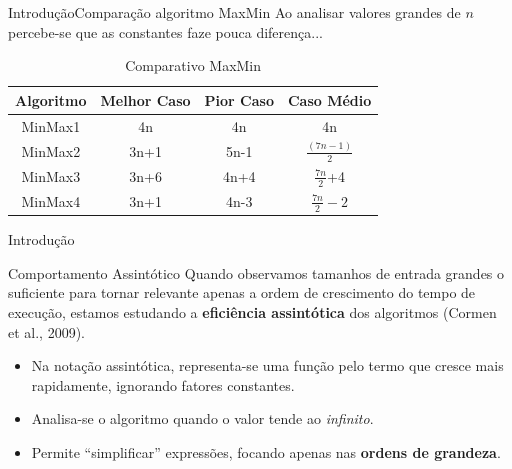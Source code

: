 \documentclass[aspectratio=169]{beamer}
\begin{document}
\begin{frame}{Introdução}{Comparação algoritmo MaxMin}
Ao analisar valores grandes de $n$ percebe-se que as constantes faze pouca diferença...
\begin{table}[]
\centering
\caption{Comparativo MaxMin}
\label{Comparativo2 MaxMin}
\begin{tabular}{c|ccc}
Algoritmo  &  Melhor Caso  &  Pior Caso  &  Caso Médio  \\
\hline
MinMax1  &   4n       &       4n   &  4n \\
MinMax2  &   3n+1     &       5n-1   &  $\frac{(7n -1)}{2}$ \\
MinMax3  &   3n+6     & 4n+4    &  $\frac{7n}{2}$+4 \\
MinMax4  &   3n+1     &      4n-3 &  $\frac{7n}{2}-2$ \\
\end{tabular}
\end{table}
\end{frame}


\begin{frame}{Introdução}
\begin{block}{Comportamento Assintótico}
Quando observamos tamanhos de entrada grandes o suficiente para tornar relevante apenas a ordem de crescimento do tempo de execução, estamos estudando a {\bf eficiência assintótica} dos algoritmos (Cormen et al., 2009).
\end{block}
\begin{itemize}
\item Na notação assintótica, representa-se uma função pelo termo que cresce mais rapidamente, ignorando fatores constantes. 
\item Analisa-se o algoritmo quando o valor tende ao {\it infinito}.
\item Permite ``simplificar'' expressões, focando apenas nas {\bf ordens de grandeza}.
\end{itemize}
\end{frame}

\end{document}
